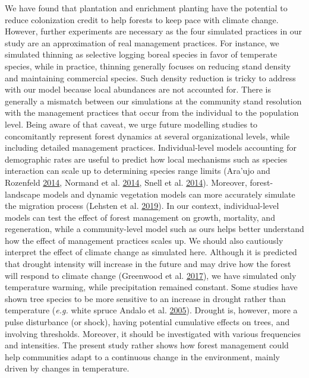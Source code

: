 \documentclass[12pt]{article}
\begin{document}
We have found that plantation and enrichment planting have the potential
to reduce colonization credit to help forests to keep pace with climate
change. However, further experiments are necessary as the four simulated
practices in our study are an approximation of real management
practices. For instance, we simulated thinning as selective logging
boreal species in favor of temperate species, while in practice,
thinning generally focuses on reducing stand density and maintaining
commercial species. Such density reduction is tricky to address with our
model because local abundances are not accounted for. There is generally
a mismatch between our simulations at the community stand resolution
with the management practices that occur from the individual to the
population level. Being aware of that caveat, we urge future modelling
studies to concomitantly represent forest dynamics at several
organizational levels, while including detailed management practices.
Individual-level models accounting for demographic rates are useful to
predict how local mechanisms such as species interaction can scale up to
determining species range limits (Ara\a'ujo and Rozenfeld
\protect\hyperlink{ref-Araujo2014a}{2014}, Normand et al.
\protect\hyperlink{ref-Normand2014}{2014}, Snell et al.
\protect\hyperlink{ref-Snell2014}{2014}). Moreover, forest-landscape
models and dynamic vegetation models can more accurately simulate the
migration process (Lehsten et al.
\protect\hyperlink{ref-Lehsten2019}{2019}). In our context,
individual-level models can test the effect of forest management on
growth, mortality, and regeneration, while a community-level model such
as ours helps better understand how the effect of management practices
scales up. We should also cautiously interpret the effect of climate
change as simulated here. Although it is predicted that drought
intensity will increase in the future and may drive how the forest will
respond to climate change (Greenwood et al.
\protect\hyperlink{ref-Greenwood2017}{2017}), we have simulated only
temperature warming, while precipitation remained constant. Some studies
have shown tree species to be more sensitive to an increase in drought
rather than temperature (\emph{e.g.} white spruce Andalo et al.
\protect\hyperlink{ref-Andalo2005}{2005}). Drought is, however, more a
pulse disturbance (or shock), having potential cumulative effects on
trees, and involving thresholds. Moreover, it should be investigated
with various frequencies and intensities. The present study rather shows
how forest management could help communities adapt to a continuous
change in the environment, mainly driven by changes in temperature.
\end{document}
